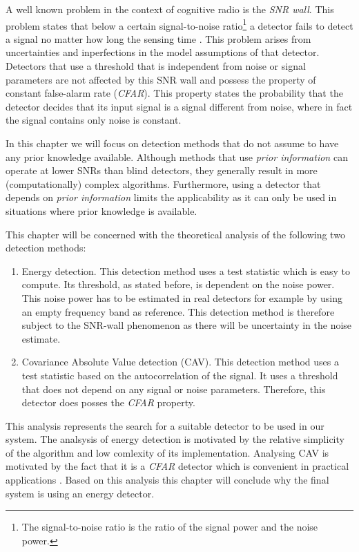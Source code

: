 \documentclass[a4paper, openany, oneside]{memoir}
\begin{document}
A well known problem in the context of cognitive radio is the \emph{SNR wall}. This problem states that below a certain signal-to-noise ratio\footnote{The signal-to-noise ratio is the ratio of the signal power and the noise power.} a detector fails to detect a signal no matter how long the sensing time \cite{sahai2009spectrum}. This problem arises from uncertainties and inperfections in the model assumptions of that detector. Detectors that use a threshold that is independent from noise or signal parameters are not affected by this SNR wall \cite{axell2012spectrum} and possess the property of constant false-alarm rate (\emph{CFAR}). This property states the probability that the detector decides that its input signal is a signal different from noise, where in fact the signal contains only noise is constant. 

In this chapter we will focus on detection methods that do not assume to have any prior knowledge available. Although methods that use \emph{prior information} can operate at lower SNRs than blind detectors, they generally result in more (computationally) complex algorithms. Furthermore, using a detector that depends on \emph{prior information} limits the applicability as it can only be used in situations where prior knowledge is available.

This chapter will be concerned with the theoretical analysis of the following two detection methods:

\begin{enumerate}
	\item Energy detection. This detection method uses a test statistic which is easy to compute. Its threshold, as stated before, is dependent on 
	the noise power. This noise power has to be estimated in real detectors for example by using an empty frequency band as reference. This detection method is therefore subject to the SNR-wall phenomenon as there will be uncertainty in the noise estimate.
	\item Covariance Absolute Value detection (CAV). This detection method uses a test statistic based on the autocorrelation of 
	the signal. It uses a threshold that does not depend on any signal or noise parameters. Therefore, this detector does posses the \emph{CFAR}
	property.
\end{enumerate}

This analysis represents the search for a suitable detector to be used in our system.  The analsysis of energy detection is motivated by the relative simplicity of the algorithm and low comlexity of its implementation. Analysing CAV is motivated by the fact that it is a \emph{CFAR} detector which is convenient in practical applications \cite{axell2012spectrum}.  Based on this analysis this chapter will conclude why the final system is using an energy detector. 
\end{document}
